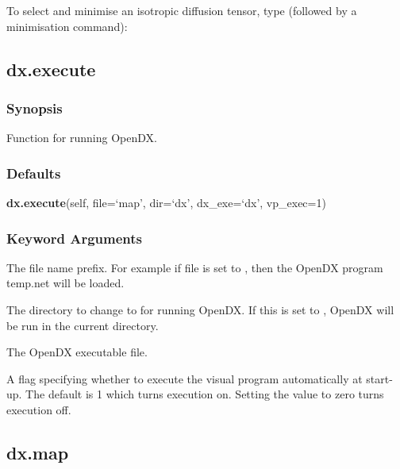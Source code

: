 


To select and minimise an isotropic diffusion tensor, type (followed by a minimisation
command):




\newpage

\subsection{dx.execute}


\subsubsection{Synopsis}

Function for running OpenDX.

\subsubsection{Defaults}

\textsf{\textbf{dx.execute}(self, file=`map', dir=`dx', dx\_exe=`dx', vp\_exec=1)}


\subsubsection{Keyword Arguments}


  The file name prefix.  For example if file is set to 
, then the OpenDX program temp.net will be loaded.

  The directory to change to for running OpenDX.  If this is set to 
, OpenDX will be run in the current directory.

  The OpenDX executable file.

  A flag specifying whether to execute the visual program automatically at start-up.  The default is 1 which turns execution on.  Setting the value to zero turns execution off.


\newpage

\subsection{dx.map}


